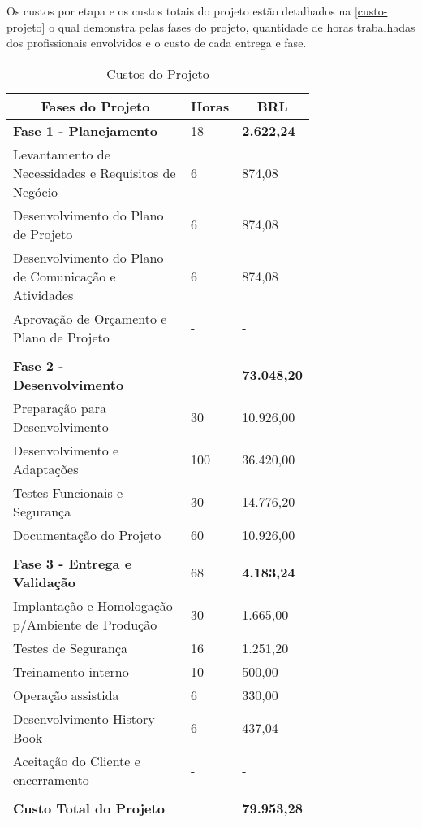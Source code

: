 Os custos por etapa e os custos totais do projeto estão detalhados na \autoref{custo-projeto} o qual demonstra pelas fases do projeto, quantidade de horas trabalhadas dos profissionais envolvidos e o custo de cada entrega e fase.

\begin{enumerate}
    \begin{table}[H]
    \caption{Custos do Projeto}
    \label{custo-projeto}
    	\centering\footnotesize
        \begin{tabular}{|p{0.60\linewidth} | p{0.04\linewidth} | p{0.10\linewidth} | }  \hline
        \multicolumn{1}{|c|}{\textbf{Fases do Projeto}} &
        \multicolumn{1}{c|}{\textbf{Horas}} &
        \multicolumn{1}{c|}{\textbf{BRL}} \\ \hline
          
        {\textbf{Fase 1 - Planejamento}}    & 18 &  {\textbf{2.622,24}}               \\  \hline
        Levantamento de Necessidades  e Requisitos de Negócio & 6 & 874,08             \\ \hline
        Desenvolvimento do Plano de Projeto & 6 & 874,08           \\ \hline
        Desenvolvimento do Plano de Comunicação e Atividades & 6 & 874,08              \\ \hline
        Aprovação de Orçamento e Plano de Projeto &  - &  -                              \\\hline
            & &   \\ \hline
        {\textbf{Fase 2 - Desenvolvimento}} & & {\textbf{73.048,20}} \\ \hline
        Preparação para Desenvolvimento & 30 & 10.926,00   \\ \hline
        Desenvolvimento e Adaptações & 100 & 36.420,00   \\ \hline
        Testes Funcionais e Segurança & 30 & 14.776,20  \\ \hline
        Documentação do Projeto & 60 & 10.926,00   \\ \hline
             & &  \\ \hline
        {\textbf{Fase 3 - Entrega e Validação}} & 68 & {\textbf{4.183,24}}  \\ \hline
        Implantação e Homologação p/Ambiente de Produção & 30 & 1.665,00\\ \hline
        Testes de Segurança & 16 & 1.251,20\\ \hline
        Treinamento interno & 10& 500,00\\ \hline
        Operação assistida & 6 & 330,00\\ \hline
        Desenvolvimento History Book & 6 & 437,04\\ \hline
        Aceitação do Cliente e encerramento & - & -\\ \hline
        & & \\ \hline
        {\textbf{Custo Total do Projeto}} &  & {\textbf{79.953,28}}\\ \hline        
        \end{tabular}
    \end{table}
\end{enumerate}